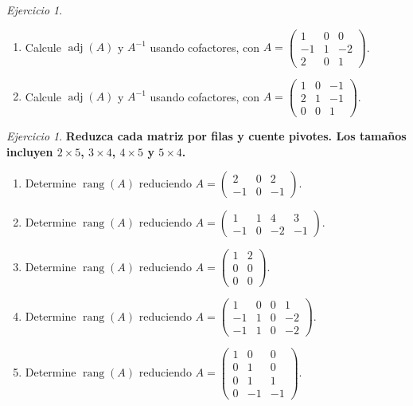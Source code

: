 \documentclass[12pt]{article}
\theoremstyle{remark}
\newtheorem{Ejer}[definicion]{Ejercicio}
\newcommand{\rang}{\operatorname{rang}}
\newcommand{\adj}{\operatorname{adj}}
\begin{document}
\begin{Ejer}
\begin{enumerate}[start=187]
\item Calcule $\adj(A)$ y $A^{-1}$ usando cofactores, con $A=\begin{pmatrix}1&0&0\\-1&1&-2\\2&0&1\end{pmatrix}$.

\item Calcule $\adj(A)$ y $A^{-1}$ usando cofactores, con $A=\begin{pmatrix}1&0&-1\\2&1&-1\\0&0&1\end{pmatrix}$.

\end{enumerate}
\end{Ejer}

\begin{Ejer}

\textbf{Reduzca cada matriz por filas y cuente pivotes. Los tamaños incluyen $2\times5$, $3\times4$, $4\times5$ y $5\times4$.}
\begin{enumerate}[start=197]

\item Determine $\rang(A)$ reduciendo $A=\begin{pmatrix}2&0&2\\-1&0&-1\end{pmatrix}$.

\item Determine $\rang(A)$ reduciendo $A=\begin{pmatrix}1&1&4&3\\-1&0&-2&-1\end{pmatrix}$.

\item Determine $\rang(A)$ reduciendo $A=\begin{pmatrix}1&2\\0&0\\0&0\end{pmatrix}$.

\item Determine $\rang(A)$ reduciendo $A=\begin{pmatrix}1&0&0&1\\-1&1&0&-2\\-1&1&0&-2\end{pmatrix}$.

\item Determine $\rang(A)$ reduciendo $A=\begin{pmatrix}1&0&0\\0&1&0\\0&1&1\\0&-1&-1\end{pmatrix}$.


\end{enumerate}
\end{Ejer}
\end{document}
